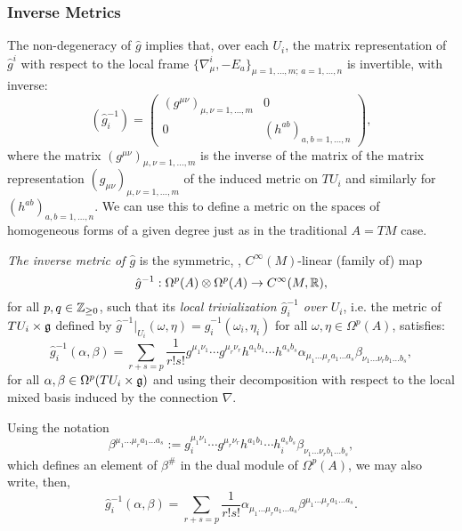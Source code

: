 \subsubsection{Inverse Metrics}

The non-degeneracy of $\hat g$ implies that, over each $U_i$, the matrix representation of $\hat g^i$ with respect to the local frame $\{\nabla^i_\mu, -E_a\}_{\mu = 1, \dots, m;\, a = 1, \dots, n}$ is invertible, with inverse:
\begin{equation}
    (\hat g_i^{-1}) = \begin{pmatrix} (g^{\mu \nu})_{\mu, \nu = 1, \dots, m} & 0 \\ 0 & (h^{a b})_{a, b = 1, \dots, n} \end{pmatrix},
\end{equation}
where the matrix $(g^{\mu \nu})_{\mu, \nu = 1, \dots, m}$ is the inverse of the matrix of the matrix representation $(g_{\mu \nu})_{\mu, \nu = 1, \dots, m}$ of the induced metric on $TU_i$ and similarly for $(h^{a b})_{a, b = 1, \dots, n}$. We can use this to define a metric on the spaces of homogeneous forms of a given degree just as in the traditional $A = TM$ case.

\begin{definition}
\emph{The inverse metric of $\hat g$} is the symmetric, , $C^\infty(M)$-linear (family of) map
\begin{equation}
    \hat g^{-1}: \Omega^p(A) \otimes \Omega^p(A) \to C^\infty(M, \mathbb{R}),
\end{equation}
for all $p, q \in \mathbb{Z}_{\geq 0}$, such that its \emph{local trivialization $\hat g_i^{-1}$ over $U_i$}, i.e. the metric of $TU_i \times \mathfrak{g}$ defined by $\hat g^{-1}|_{U_i}(\omega, \eta) = \hat g_i^{-1} (\omega_i, \eta_i)$ for all $\omega, \eta \in \Omega^p(A)$, satisfies:
\begin{equation*}
    \hat g_i^{-1} (\alpha, \beta) 
    = \sum_{r+s = p} \frac{1}{r!s!}  g^{\mu_1 \nu_1} \cdots g^{\mu_r \nu_r} h^{a_1 b_1} \cdots h^{a_s b_s} \alpha_{\mu_1 \dots \mu_r a_1 \dots a_s} \beta_{\nu_1 \dots \nu_r b_1 \dots  b_s},
\end{equation*}
for all $\alpha, \beta \in \Omega^p(TU_i \times \mathfrak{g})$ and using their decomposition with respect to the local mixed basis induced by the connection $\nabla$. 

Using the notation
\begin{equation}
    \beta^{\mu_1 \dots \mu_r a_1 \dots a_s} := g_i^{\mu_1 \nu_1} \cdots g^{\mu_r \nu_r} h^{a_1 b_1} \cdots h_i^{a_s b_s} \beta_{\nu_1 \dots \nu_r b_1 \dots  b_s},
\end{equation}
which defines an element of $\beta^\#$ in the dual module of $\Omega^p(A)$, we may also write, then,
\begin{equation}
    \hat g_i^{-1}(\alpha, \beta) = \sum_{r+s = p} \frac{1}{r!s!} \alpha_{\mu_1 \dots \mu_r a_1 \dots a_s} \beta^{\mu_1 \dots \mu_r a_1 \dots  a_s}.
\end{equation}
\end{definition}

